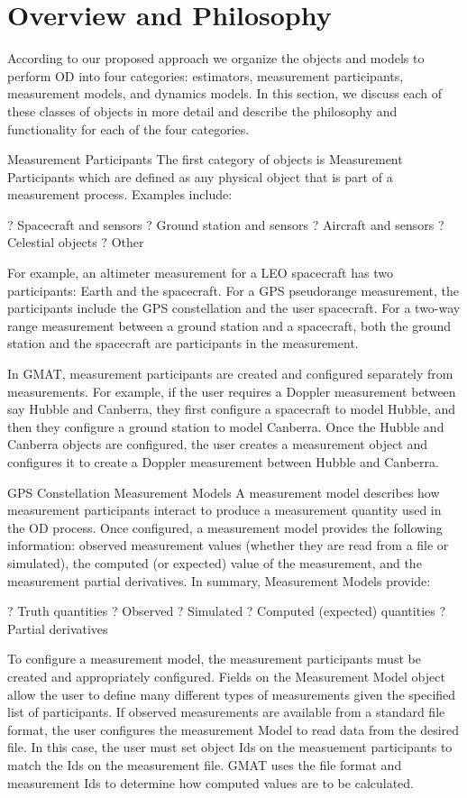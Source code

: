 \section{Overview and Philosophy}


According to our proposed approach we organize the objects and
models to perform OD into four categories:  estimators, measurement
participants, measurement models, and dynamics models.  In this
section, we discuss each of these classes of objects in more detail
and describe the philosophy and functionality for each of the four
categories.

Measurement Participants The first category of objects is
Measurement Participants which are defined as any physical object
that is part of a measurement process.  Examples include:

?   Spacecraft and sensors ?   Ground station and sensors ?
Aircraft and sensors ?   Celestial objects ?   Other

For example,  an altimeter measurement for a LEO spacecraft has two
participants: Earth and the spacecraft.  For a GPS pseudorange
measurement, the participants include the GPS constellation and the
user spacecraft.   For a two-way range measurement between a ground
station and a spacecraft, both the ground station and the spacecraft
are participants in the measurement.

In GMAT, measurement participants are created and configured
separately from measurements.  For example, if the user requires a
Doppler measurement between say Hubble and Canberra, they first
configure a spacecraft to model Hubble, and then they configure a
ground station to model Canberra.  Once the Hubble and Canberra
objects are configured, the user creates a measurement object and
configures it to create a Doppler measurement between Hubble and
Canberra.


GPS Constellation Measurement Models A measurement model describes
how measurement participants interact to produce a measurement
quantity used in the OD process.  Once configured, a measurement
model provides the following information: observed measurement
values (whether they are read from a file or simulated),  the
computed (or expected) value of the measurement, and the measurement
partial derivatives.   In summary, Measurement Models provide:

?   Truth quantities ?   Observed ?   Simulated ?   Computed
(expected) quantities ?   Partial derivatives

To configure a measurement model, the measurement participants must
be created and appropriately configured.   Fields on the Measurement
Model object allow the user to define many different types of
measurements given the specified list of participants.   If observed
measurements are available from a standard file format, the user
configures the measurement Model to read data from the desired file.
In this case, the user must set object Ids on the measuement
participants to match the Ids on the measurement file.  GMAT uses
the file format and measurement Ids to determine how computed values
are to be calculated.

